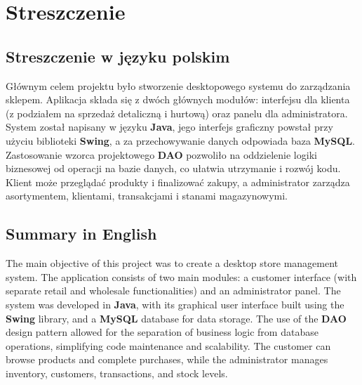 \chapter{Streszczenie}
\label{chap:nowe_wprowadzenie}

\section{Streszczenie w języku polskim}
Głównym celem projektu było stworzenie desktopowego systemu do zarządzania sklepem. Aplikacja składa się z dwóch głównych modułów: interfejsu dla klienta (z podziałem na sprzedaż detaliczną i hurtową) oraz panelu dla administratora. System został napisany w języku \textbf{Java}, jego interfejs graficzny powstał przy użyciu biblioteki \textbf{Swing}, a za przechowywanie danych odpowiada baza \textbf{MySQL}. Zastosowanie wzorca projektowego \textbf{DAO} pozwoliło na oddzielenie logiki biznesowej od operacji na bazie danych, co ułatwia utrzymanie i rozwój kodu. Klient może przeglądać produkty i finalizować zakupy, a administrator zarządza asortymentem, klientami, transakcjami i stanami magazynowymi.

\section{Summary in English}
The main objective of this project was to create a desktop store management system. The application consists of two main modules: a customer interface (with separate retail and wholesale functionalities) and an administrator panel. The system was developed in \textbf{Java}, with its graphical user interface built using the \textbf{Swing} library, and a \textbf{MySQL} database for data storage. The use of the \textbf{DAO} design pattern allowed for the separation of business logic from database operations, simplifying code maintenance and scalability. The customer can browse products and complete purchases, while the administrator manages inventory, customers, transactions, and stock levels.